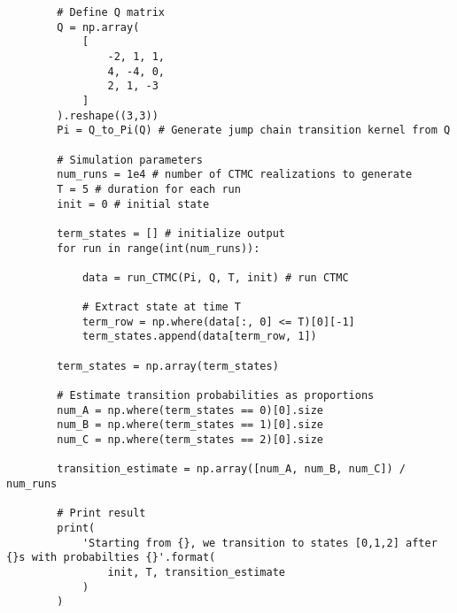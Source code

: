 \documentclass[11pt, letterpaper]{article}
\begin{document}
\begin{verbatim}
        # Define Q matrix
        Q = np.array(
            [
                -2, 1, 1,
                4, -4, 0,
                2, 1, -3
            ]
        ).reshape((3,3))
        Pi = Q_to_Pi(Q) # Generate jump chain transition kernel from Q

        # Simulation parameters
        num_runs = 1e4 # number of CTMC realizations to generate
        T = 5 # duration for each run
        init = 0 # initial state

        term_states = [] # initialize output 
        for run in range(int(num_runs)):

            data = run_CTMC(Pi, Q, T, init) # run CTMC

            # Extract state at time T
            term_row = np.where(data[:, 0] <= T)[0][-1]
            term_states.append(data[term_row, 1])

        term_states = np.array(term_states)

        # Estimate transition probabilities as proportions
        num_A = np.where(term_states == 0)[0].size
        num_B = np.where(term_states == 1)[0].size
        num_C = np.where(term_states == 2)[0].size

        transition_estimate = np.array([num_A, num_B, num_C]) / num_runs

        # Print result
        print(
            'Starting from {}, we transition to states [0,1,2] after {}s with probabilties {}'.format(
                init, T, transition_estimate
            )
        )
    \end{verbatim}
\end{document}
